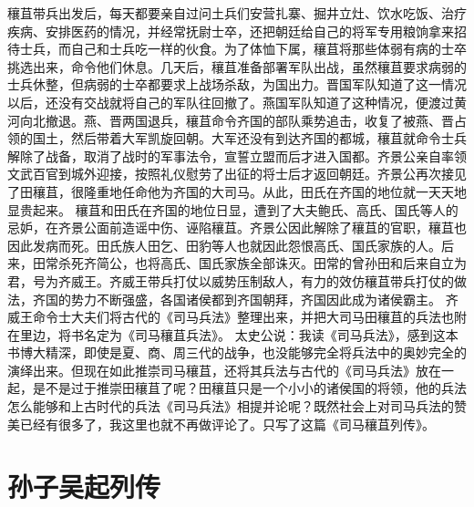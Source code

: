 \documentclass[12pt,UTF8]{ctexbook}
\begin{document}
穰苴带兵出发后，每天都要亲自过问土兵们安营扎寨、掘井立灶、饮水吃饭、治疗疾病、安排医药的情况，并经常抚尉士卒，还把朝廷给自己的将军专用粮饷拿来招待士兵，而自己和士兵吃一样的伙食。为了体恤下属，穰苴将那些体弱有病的士卒挑选出来，命令他们休息。几天后，穰苴准备部署军队出战，虽然穰苴要求病弱的士兵休整，但病弱的士卒都要求上战场杀敌，为国出力。晋国军队知道了这一情况以后，还没有交战就将自己的军队往回撤了。燕国军队知道了这种情况，便渡过黄河向北撤退。燕、晋两国退兵，穰苴命令齐国的部队乘势追击，收复了被燕、晋占领的国土，然后带着大军凯旋回朝。大军还没有到达齐国的都城，穰苴就命令士兵解除了战备，取消了战时的军事法令，宣誓立盟而后才进入国都。齐景公亲自率领文武百官到城外迎接，按照礼仪慰劳了出征的将士后才返回朝廷。齐景公再次接见了田穰苴，很隆重地任命他为齐国的大司马。从此，田氏在齐国的地位就一天天地显贵起来。
穰苴和田氏在齐国的地位日显，遭到了大夫鲍氏、高氏、国氏等人的忌妒，在齐景公面前造谣中伤、诬陷穰苴。齐景公因此解除了穰苴的官职，穰苴也因此发病而死。田氏族人田乞、田豹等人也就因此怨恨高氏、国氏家族的人。后来，田常杀死齐简公，也将高氏、国氏家族全部诛灭。田常的曾孙田和后来自立为君，号为齐威王。齐威王带兵打仗以威势压制敌人，有力的效仿穰苴带兵打仗的做法，齐国的势力不断强盛，各国诸侯都到齐国朝拜，齐国因此成为诸侯霸主。
齐威王命令士大夫们将古代的《司马兵法》整理出来，并把大司马田穰苴的兵法也附在里边，将书名定为《司马穰苴兵法》。
太史公说：我读《司马兵法》，感到这本书博大精深，即使是夏、商、周三代的战争，也没能够完全将兵法中的奥妙完全的演绎出来。但现在如此推崇司马穰苴，还将其兵法与古代的《司马兵法》放在一起，是不是过于推崇田穰苴了呢？田穰苴只是一个小小的诸侯国的将领，他的兵法怎么能够和上古时代的兵法《司马兵法》相提并论呢？既然社会上对司马兵法的赞美已经有很多了，我这里也就不再做评论了。只写了这篇《司马穰苴列传》。



\chapter{孙子吴起列传}
\end{document}
